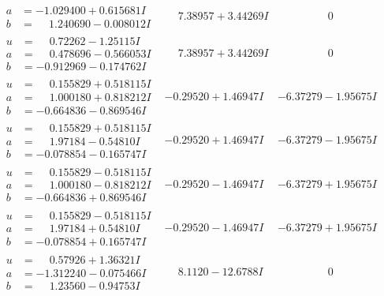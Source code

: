 \documentclass[1p]{elsarticle_modified}
\theoremstyle{definition}
\begin{document}
$$\begin{array}{c|c|c}
\begin{aligned}
a &= -1.029400 + 0.615681 I \\
b &= \phantom{-}1.240690 - 0.008012 I\end{aligned}
 & \phantom{-}7.38957 + 3.44269 I & \phantom{-0.000000 } 0 \\ \hline\begin{aligned}
u &= \phantom{-}0.72262 - 1.25115 I \\
a &= \phantom{-}0.478696 - 0.566053 I \\
b &= -0.912969 - 0.174762 I\end{aligned}
 & \phantom{-}7.38957 + 3.44269 I & \phantom{-0.000000 } 0 \\ \hline\begin{aligned}
u &= \phantom{-}0.155829 + 0.518115 I \\
a &= \phantom{-}1.000180 + 0.818212 I \\
b &= -0.664836 - 0.869546 I\end{aligned}
 & -0.29520 + 1.46947 I & -6.37279 - 1.95675 I \\ \hline\begin{aligned}
u &= \phantom{-}0.155829 + 0.518115 I \\
a &= \phantom{-}1.97184 - 0.54810 I \\
b &= -0.078854 - 0.165747 I\end{aligned}
 & -0.29520 + 1.46947 I & -6.37279 - 1.95675 I \\ \hline\begin{aligned}
u &= \phantom{-}0.155829 - 0.518115 I \\
a &= \phantom{-}1.000180 - 0.818212 I \\
b &= -0.664836 + 0.869546 I\end{aligned}
 & -0.29520 - 1.46947 I & -6.37279 + 1.95675 I \\ \hline\begin{aligned}
u &= \phantom{-}0.155829 - 0.518115 I \\
a &= \phantom{-}1.97184 + 0.54810 I \\
b &= -0.078854 + 0.165747 I\end{aligned}
 & -0.29520 - 1.46947 I & -6.37279 + 1.95675 I \\ \hline\begin{aligned}
u &= \phantom{-}0.57926 + 1.36321 I \\
a &= -1.312240 - 0.075466 I \\
b &= \phantom{-}1.23560 - 0.94753 I\end{aligned}
 & \phantom{-}8.1120 - 12.6788 I & \phantom{-0.000000 } 0 \\ \hline\begin{aligned}

\end{aligned}
\end{array}$$
\end{document}
